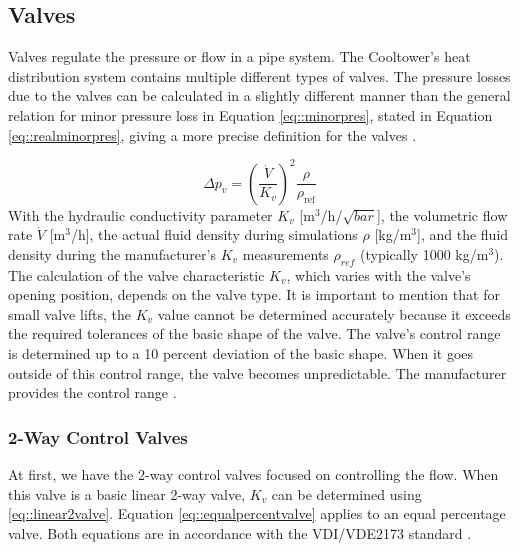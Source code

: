 


\subsection{Valves}\label{sec::valves}
Valves regulate the pressure or flow in a pipe system. The Cooltower's heat distribution system contains multiple different types of valves. The pressure losses due to the valves can be calculated in a slightly different manner than the general relation for minor pressure loss in Equation \ref{eq::minorpres}, stated in Equation \ref{eq::realminorpres}, giving a more precise definition for the valves \cite{Artikelphdchris}. 

\begin{equation}\label{eq::realminorpres}
    \Delta p_{v} = \left( \frac{\dot{V}}{K_v} \right)^{2} \frac{\rho}{\rho_{\text{ref}}}    
\end{equation}
With the hydraulic conductivity parameter $K_v$  [m$^3$/h/$\sqrt{bar}$], the volumetric flow rate $\dot{V}$ [m$^3$/h], the actual fluid density during simulations $\rho$ [kg/m$^3$], and the fluid density during the manufacturer's $K_v$ measurements $\rho_{ref}$ (typically 1000 kg/m$^3$). The calculation of the valve characteristic $K_v$, which varies with the valve's opening position, depends on the valve type. It is important to mention that for small valve lifts, the $K_v$ value cannot be determined accurately because it exceeds the required tolerances of the basic shape of the valve. The valve's control range is determined up to a 10 percent deviation of the basic shape. When it goes outside of this control range, the valve becomes unpredictable. The manufacturer provides the control range \cite{echtephdthesis}.

\subsubsection{2-Way Control Valves}
At first, we have the 2-way control valves focused on controlling the flow. When this valve is a basic linear 2-way valve, $K_v$ can be determined using \ref{eq::linear2valve}. Equation  \ref{eq::equalpercentvalve} applies to an equal percentage valve. Both equations are in accordance with the VDI/VDE2173 standard \cite{VDI/VDE2713}. 

